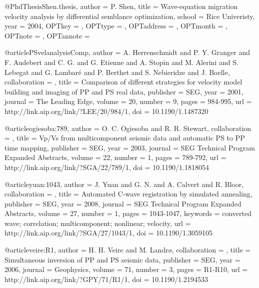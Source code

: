 {@PhdThesis{Shen.thesis,
  author = 	 {P. Shen},
  title = 	 {Wave-equation migration velocity analysis by
                  differential semblance optimization},
  school = 	 {Rice Univeristy},
  year = 	 {2004},
  OPTkey = 	 {},
  OPTtype = 	 {},
  OPTaddress = 	 {},
  OPTmonth = 	 {},
  OPTnote = 	 {},
  OPTannote = 	 {}
}

@article{PSvelanalysisComp,
author = {A. Herrenschmidt and P. Y. Granger and
                  F. Audebert and C. G. and
                  G. Etienne and A. Stopin and M.
                  Alerini and S. Lebegat and G. Lambar\'{e}
                  and P. Berthet and S. Nebieridze and
                  J. Boelle},
collaboration = {},
title = {Comparison of different strategies for velocity model
                  building and imaging of {PP} and {PS} real data},
publisher = {SEG},
year = {2001},
journal = {The Leading Edge},
volume = {20},
number = {9},
pages = {984-995},
url = {http://link.aip.org/link/?LEE/20/984/1},
doi = {10.1190/1.1487320}
}









@article{ogiesoba:789,
author = {O. C. Ogiesoba and R. R. Stewart},
collaboration = {},
title = {Vp/{V}s from multicomponent seismic data and automatic {PS}
                  to {PP} time mapping},
publisher = {SEG},
year = {2003},
journal = {SEG Technical Program Expanded Abstracts},
volume = {22},
number = {1},
pages = {789-792},
url = {http://link.aip.org/link/?SGA/22/789/1},
doi = {10.1190/1.1818054}
}





@article{yuan:1043,
author = {J. Yuan and G. N. and A. Calvert and
                  R. Bloor},
collaboration = {},
title = {Automated {C}-wave registration by simulated annealing},
publisher = {SEG},
year = {2008},
journal = {SEG Technical Program Expanded Abstracts},
volume = {27},
number = {1},
pages = {1043-1047},
keywords = {converted wave; correlation; multicomponent; nonlinear;
                  velocity},
url = {http://link.aip.org/link/?SGA/27/1043/1},
doi = {10.1190/1.3059105}
}

@article{veire:R1,
author = {H. H. Veire and M. Landr\o},
collaboration = {},
title = {Simultaneous inversion of {PP} and {PS} seismic data},
publisher = {SEG},
year = {2006},
journal = {Geophysics},
volume = {71},
number = {3},
pages = {R1-R10},
url = {http://link.aip.org/link/?GPY/71/R1/1},
doi = {10.1190/1.2194533}
}

}
